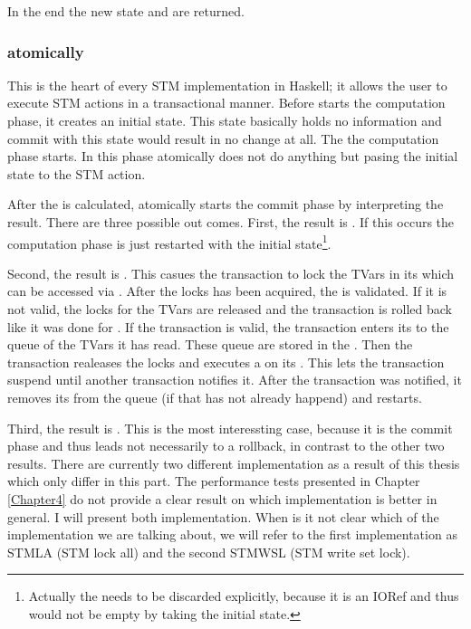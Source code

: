 In the end the new state and \code{()} are returned.

\subsubsection{atomically}
This is the heart of every STM implementation in Haskell; it allows the user to execute STM 
actions in a transactional manner. Before  starts the computation phase, it
creates an initial state. This state basically holds no information and commit with this state
would result in no change at all. The the computation phase starts. In this phase atomically 
does not do anything but pasing the initial state to the STM action.

After the  is calculated, atomically starts the commit phase by interpreting
the result. There are three possible out comes.
First, the result is . If this occurs the computation phase is just restarted 
with the initial state\footnote{Actually the  needs to be discarded explicitly,
because it is an IORef and thus would not be empty by taking the initial state.}. 

Second, the result is . This casues the transaction to lock the TVars in its 
 which can be accessed via . After the locks has been acquired, 
the  is validated. If it is not valid, the locks for the TVars are released and
the transaction is rolled back like it was done for . If the transaction is 
valid, the transaction enters its  to the queue of the TVars it has read.
These queue are stored in the . Then the transaction realeases the locks and 
executes a  on its . This lets the transaction suspend until
another transaction notifies it. After the transaction was notified, it removes its 
 from the queue (if that has not already happend) and restarts.

Third, the result is . This is the most interessting case, 
because it is the commit phase and thus leads not necessarily to a rollback, in contrast to 
the other two results. 
There are currently two different implementation as a result of this thesis which 
only differ in this part. The performance tests presented in Chapter \ref{Chapter4} do
not provide a clear result on which implementation is better in general. I will present
both implementation. When is it not clear which of the implementation we are talking about,
we will refer to the first implementation as STMLA (STM lock all) and the second STMWSL 
(STM write set lock). 


